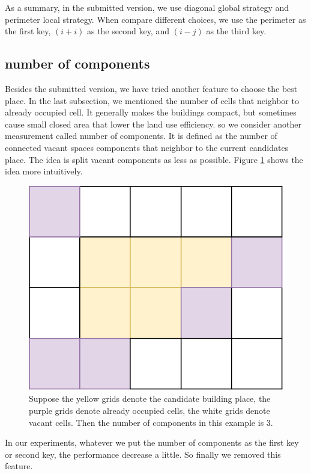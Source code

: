 \documentclass{article}
\begin{document}
As a summary, in the submitted version, we use diagonal global strategy and perimeter local strategy. When compare different choices, we use the perimeter as the first key, $(i+i)$ as the second key, and $(i-j)$ as the third key.
\subsection{number of components}
Besides the submitted version, we have tried another feature to choose the best place. In the last subsection, we mentioned the number of cells that neighbor to already occupied cell. It generally makes the buildings compact, but sometimes cause small closed area that lower the land use efficiency. so we consider another measurement called number of components. It is defined as the number of connected vacant spaces components that neighbor to the current candidates place. The idea is split vacant components as less as possible. Figure \ref{fig: numComponents} shows the idea more intuitively.

\begin{figure}
\center
\includegraphics[scale=0.5]{numComponents.pdf}
\caption{
Suppose the yellow grids denote the candidate building place,
the purple grids denote already occupied cells,
the white grids denote vacant cells.
Then the number of components in this example is 3.}
\label{fig: numComponents}
\end{figure}

In our experiments, whatever we put the number of components as the first key or second key, the performance decrease a little. So finally we removed this feature.
\end{document}
